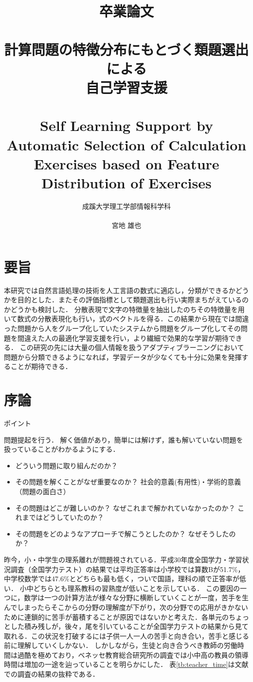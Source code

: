 \documentclass[a4j,11pt,report]{jsbook}
\title{卒業論文\\　\vspace{3em}\\{\huge #1}\\　\\#2\vspace{15em}}%
\author{{\huge 成蹊大学理工学部情報科学科}\\　\\{\huge #3}}%
\date{}
\newcommand{\frontpage}[3]{%
\title{卒業論文\\　\vspace{3em}\\{\huge #1}\\　\\#2\vspace{15em}}%
\author{{\huge 成蹊大学理工学部情報科学科}\\　\\{\huge #3}}%
\date{}
\maketitle
\clearpage
\thispagestyle{empty}

\clearpage
}
\newcommand{\point}[1]{
\begin{itembox}[l]{ポイント}
  #1
\end{itembox}
}
\begin{document}
\frontpage  %
{計算問題の特徴分布にもとづく類題選出による\\自己学習支援}
{Self Learning Support by Automatic Selection of Calculation Exercises based on Feature Distribution of Exercises}
{宮地 雄也}



\chapter*{要旨}
\thispagestyle{empty}

本研究では自然言語処理の技術を人工言語の数式に適応し，分類ができるかどうかを目的とした．またその評価指標として類題選出も行い実際まちがえているのかどうかも検討した．
分散表現で文字の特徴量を抽出したのちその特徴量を用いて数式の分散表現化も行い，式のベクトルを得る．この結果から現在では間違った問題から人をグループ化していたシステムから問題をグループ化してその問題を間違えた人の最適化学習支援を行い，より繊細で効果的な学習が期待できる．
この研究の先には大量の個人情報を扱うアダプティブラーニングにおいて問題から分類できるようになれば，学習データが少なくても十分に効果を発揮することが期待できる．


\tableofcontents
\thispagestyle{empty}
\clearpage
\thispagestyle{plain}
\setcounter{page}{1}

\chapter{序論 \label{ch:introduction}}

\point{
問題提起を行う．
解く価値があり，簡単には解けず，誰も解いていない問題を扱っていることがわかるようにする．
\begin{itemize}
  \item どういう問題に取り組んだのか？
  \item その問題を解くことがなぜ重要なのか？ 社会的意義(有用性)・学術的意義（問題の面白さ）
  \item その問題はどこが難しいのか？ なぜこれまで解かれていなかったのか？ これまではどうしていたのか？
  \item その問題をどのようなアプローチで解こうとしたのか？ なぜそうしたのか？
\end{itemize}
}
\fi

昨今，小・中学生の理系離れが問題視されている．平成30年度全国学力・学習状況調査（全国学力テスト）の結果では平均正答率は小学校では算数Bが51.7\%，中学校数学では47.6\%とどちらも最も低く，ついで国語，理科の順で正答率が低い．
小中どちらとも理系教科の習熟度が低いことを示している．
この要因の一つに，数学は一つの計算方法が様々な分野に横断していくことが一度，苦手を生んでしまったらそこからの分野の理解度が下がり，次の分野での応用がきかないために連鎖的に苦手が蓄積することが原因ではないかと考えた．各単元のちょっとした積み残しが，後々，尾を引いていることが全国学力テストの結果から見て取れる．この状況を打破するには子供一人一人の苦手と向き合い，苦手と感じる前に理解していくしかない．
しかしながら，生徒と向き合うべき教師の労働時間は過酷を極めており，ベネッセ教育総合研究所の調査では小中高の教員の領導時間は増加の一途を辿っていることを明らかにした．
表\ref{tb:teacher_time}は文献\cite{benesse_DateBook}での調査の結果の抜粋である．
\end{document}
